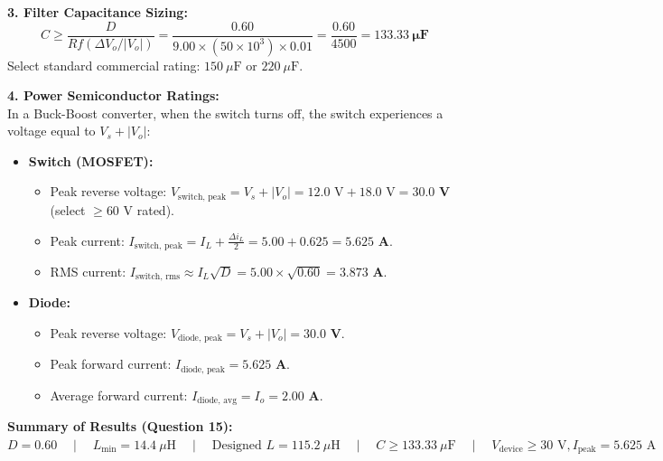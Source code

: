 \documentclass[10pt,a4paper]{article}
\begin{document}
\noindent\textbf{3. Filter Capacitance Sizing:}\\
\[
C \ge \frac{D}{R f (\Delta V_o / |V_o|)} = \frac{0.60}{9.00 \times (50 \times 10^3) \times 0.01} = \frac{0.60}{4500} = \mathbf{133.33\ \mu\text{F}}
\]
Select standard commercial rating: \textbf{$150\ \mu\text{F}$} or \textbf{$220\ \mu\text{F}$}.

\noindent\textbf{4. Power Semiconductor Ratings:}\\
In a Buck-Boost converter, when the switch turns off, the switch experiences a voltage equal to $V_s + |V_o|$:
\begin{itemize}
  \item \textbf{Switch (MOSFET):}
    \begin{itemize}
      \item Peak reverse voltage: $V_{\text{switch, peak}} = V_s + |V_o| = 12.0\text{ V} + 18.0\text{ V} = \mathbf{30.0\text{ V}}$ (select $\ge 60\text{ V}$ rated).
      \item Peak current: $I_{\text{switch, peak}} = I_L + \frac{\Delta i_L}{2} = 5.00 + 0.625 = \mathbf{5.625\text{ A}}$.
      \item RMS current: $I_{\text{switch, rms}} \approx I_L \sqrt{D} = 5.00 \times \sqrt{0.60} = \mathbf{3.873\text{ A}}$.
    \end{itemize}
  \item \textbf{Diode:}
    \begin{itemize}
      \item Peak reverse voltage: $V_{\text{diode, peak}} = V_s + |V_o| = \mathbf{30.0\text{ V}}$.
      \item Peak forward current: $I_{\text{diode, peak}} = \mathbf{5.625\text{ A}}$.
      \item Average forward current: $I_{\text{diode, avg}} = I_o = \mathbf{2.00\text{ A}}$.
    \end{itemize}
\end{itemize}

\begin{tcolorbox}[resbox]
\textbf{\textcolor{accentcyan}{Summary of Results (Question 15):}}\\
$D = 0.60 \quad\mid\quad L_{\min} = 14.4\ \mu\text{H} \quad\mid\quad \text{Designed } L = 115.2\ \mu\text{H} \quad\mid\quad C \ge 133.33\ \mu\text{F} \quad\mid\quad V_{\text{device}} \ge 30\text{ V}, I_{\text{peak}} = 5.625\text{ A}$
\end{tcolorbox}
\end{document}
